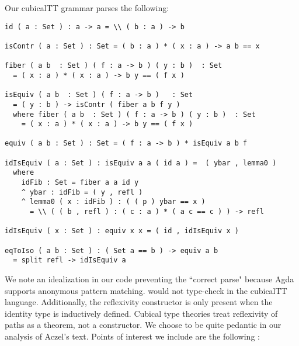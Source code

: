 Our cubicalTT grammar parses the following:

\begin{verbatim}
id ( a : Set ) : a -> a = \\ ( b : a ) -> b

isContr ( a : Set ) : Set = ( b : a ) * ( x : a ) -> a b == x

fiber ( a b  : Set ) ( f : a -> b ) ( y : b )  : Set
  = ( x : a ) * ( x : a ) -> b y == ( f x )

isEquiv ( a b  : Set ) ( f : a -> b )   : Set
  = ( y : b ) -> isContr ( fiber a b f y )
  where fiber ( a b  : Set ) ( f : a -> b ) ( y : b )  : Set
    = ( x : a ) * ( x : a ) -> b y == ( f x )

equiv ( a b : Set ) : Set = ( f : a -> b ) * isEquiv a b f

idIsEquiv ( a : Set ) : isEquiv a a ( id a ) =  ( ybar , lemma0 )
  where
    idFib : Set = fiber a a id y
    ^ ybar : idFib = ( y , refl )
    ^ lemma0 ( x : idFib ) : ( ( p ) ybar == x )
      = \\ ( ( b , refl ) : ( c : a ) * ( a c == c ) ) -> refl

idIsEquiv ( x : Set ) : equiv x x = ( id , idIsEquiv x )

eqToIso ( a b : Set ) : ( Set a == b ) -> equiv a b
  = split refl -> idIsEquiv a
\end{verbatim}

We note an idealization in our code preventing the ``correct parse" because Agda
supports anonymous pattern matching.  would not
type-check in the cubicalTT language. Additionally, the reflexivity constructor
is only present when the identity type is inductively defined. Cubical type theories
treat reflexivity of paths as a theorem, not a constructor. We choose to be
quite pedantic in our analysis of Aczel's text. Points of interest we include
are the following :

